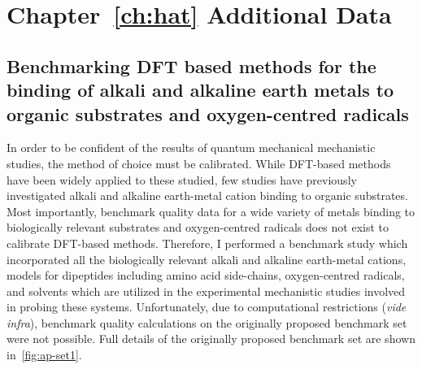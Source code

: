 \chapter{Chapter~\protect\ref{ch:hat} Additional Data}\label{ap:hat}

\begin{doublespace}

\section{Benchmarking DFT based methods for the binding of alkali and alkaline
earth metals to organic substrates and oxygen-centred radicals}
\label{sec:benchmark}

In order to be confident of the results of quantum mechanical mechanistic
studies, the method of choice must be calibrated. While DFT-based methods have
been widely applied to these studied, few studies have previously investigated
alkali and alkaline earth-metal cation binding to organic
substrates.\cite{Corral2003, Suarez2011, Siu2001, Baldauf2013} Most importantly,
benchmark quality data for a wide variety of metals binding to biologically
relevant substrates and oxygen-centred radicals does not exist to calibrate
DFT-based methods. Therefore, I performed a benchmark study which incorporated
all the biologically relevant alkali and alkaline earth-metal cations, models
for dipeptides including amino acid side-chains, oxygen-centred radicals, and
solvents which are utilized in the experimental mechanistic studies involved in
probing these systems. Unfortunately, due to computational restrictions
(\emph{vide infra}), benchmark quality calculations on the originally proposed
benchmark set were not possible. Full details of the originally proposed
benchmark set are shown in~\ref{fig:ap-set1}.


\end{doublespace}
